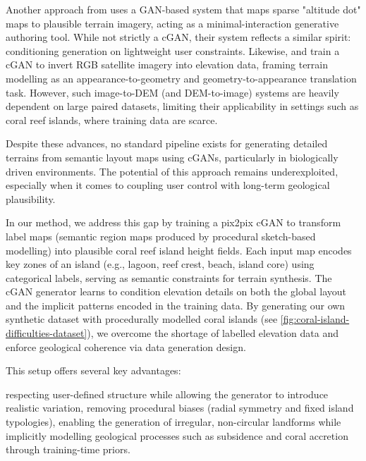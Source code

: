 Another approach from \cite{Voulgaris2021} uses a GAN-based system that maps sparse "altitude dot" maps to plausible terrain imagery, acting as a minimal-interaction generative authoring tool. While not strictly a cGAN, their system reflects a similar spirit: conditioning generation on lightweight user constraints. Likewise, \cite{Panagiotou2020} and \cite{Beckham2017} train a cGAN to invert RGB satellite imagery into elevation data, framing terrain modelling as an appearance-to-geometry and geometry-to-appearance translation task. However, such image-to-DEM (and DEM-to-image) systems are heavily dependent on large paired datasets, limiting their applicability in settings such as coral reef islands, where training data are scarce.

Despite these advances, no standard pipeline exists for generating detailed terrains from semantic layout maps using cGANs, particularly in biologically driven environments. %
The potential of this approach remains underexploited, especially when it comes to coupling user control with long-term geological plausibility.

\midConclusion

In our method, we address this gap by training a pix2pix cGAN to transform label maps (semantic region maps produced by procedural sketch-based modelling) into plausible coral reef island height fields. Each input map encodes key zones of an island (e.g., lagoon, reef crest, beach, island core) using categorical labels, serving as semantic constraints for terrain synthesis. The cGAN generator learns to condition elevation details on both the global layout and the implicit patterns encoded in the training data. By generating our own synthetic dataset with procedurally modelled coral islands (see \cref{fig:coral-island-difficulties-dataset}), we overcome the shortage of labelled elevation data and enforce geological coherence via data generation design.

This setup offers several key advantages: 
\begin{Itemize}
    \Item{} respecting user-defined structure while allowing the generator to introduce realistic variation,
    \Item{} removing procedural biases (radial symmetry and fixed island typologies),
    \Item{} enabling the generation of irregular, non-circular landforms while implicitly modelling geological processes such as subsidence and coral accretion through training-time priors.
\end{Itemize}

